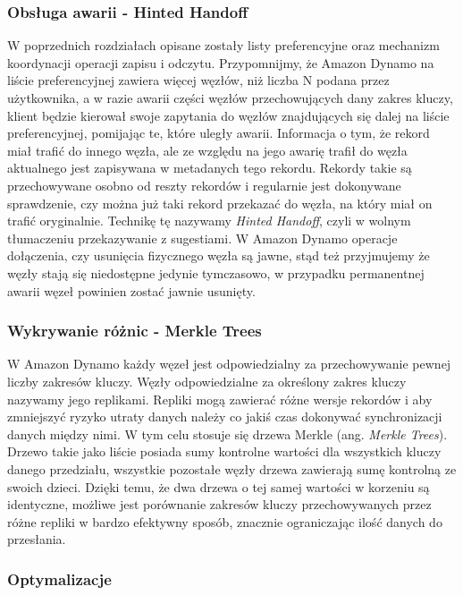 \subsubsection*{Obsługa awarii - Hinted Handoff}
\label{sec:dynamo-hinted-handoff}

W poprzednich rozdziałach opisane zostały listy preferencyjne oraz mechanizm koordynacji operacji zapisu i odczytu.
Przypomnijmy, że Amazon Dynamo na liście preferencyjnej zawiera więcej węzłów, niż liczba N podana przez użytkownika, a w razie awarii części węzłów przechowujących dany zakres kluczy, klient będzie kierował swoje zapytania do węzłów znajdujących się dalej na liście preferencyjnej, pomijając te, które uległy awarii.
Informacja o tym, że rekord miał trafić do innego węzła, ale ze względu na jego awarię trafił do węzła aktualnego jest zapisywana w metadanych tego rekordu.
Rekordy takie są przechowywane osobno od reszty rekordów i regularnie jest dokonywane sprawdzenie, czy można już taki rekord przekazać do węzła, na który miał on trafić oryginalnie.
Technikę tę nazywamy \emph{Hinted Handoff}, czyli w wolnym tłumaczeniu przekazywanie z sugestiami.
W Amazon Dynamo operacje dołączenia, czy usunięcia fizycznego węzła są jawne, stąd też przyjmujemy że węzły stają się niedostępne jedynie tymczasowo, w przypadku permanentnej awarii węzeł powinien zostać jawnie usunięty.

\subsubsection*{Wykrywanie różnic - Merkle Trees}
\label{merkle-trees}

W Amazon Dynamo każdy węzeł jest odpowiedzialny za przechowywanie pewnej liczby zakresów kluczy.
Węzły odpowiedzialne za określony zakres kluczy nazywamy jego replikami.
Repliki mogą zawierać różne wersje rekordów i aby zmniejszyć ryzyko utraty danych należy co jakiś czas dokonywać synchronizacji danych między nimi.
W tym celu stosuje się drzewa Merkle (ang. \emph{Merkle Trees}).
Drzewo takie jako liście posiada sumy kontrolne wartości dla wszystkich kluczy danego przedziału, wszystkie pozostałe węzły drzewa zawierają sumę kontrolną ze swoich dzieci.
Dzięki temu, że dwa drzewa o tej samej wartości w korzeniu są identyczne, możliwe jest porównanie zakresów kluczy przechowywanych przez różne repliki w bardzo efektywny sposób, znacznie ograniczając ilość danych do przesłania.

\subsubsection*{Optymalizacje}

